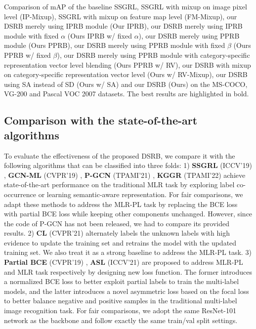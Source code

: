 \documentclass[lettersize,journal]{IEEEtran}
\begin{document}
\begin{table*}
  \caption{Comparison of mAP of the baseline SSGRL, SSGRL with mixup on image pixel level (IP-Mixup), SSGRL with mixup on feature map level (FM-Mixup), our DSRB merely using IPRB module (Our IPRB), our DSRB merely using IPRB module with fixed $\alpha$ (Ours IPRB w/ fixed $\alpha$), our DSRB merely using PPRB module (Ours PPRB), our DSRB merely using PPRB module with fixed $\beta$ (Ours PPRB w/ fixed $\beta$), our DSRB merely using PPRB module with category-specific representation vector level blending (Ours PPRB w/ RV), our DSRB with mixup on category-specific representation vector level (Ours w/ RV-Mixup), our DSRB using SA instead of SD (Ours w/ SA) and our DSRB (Ours) on the MS-COCO, VG-200 and Pascal VOC 2007 datasets. The best results are highlighted in bold.}
  \label{tab:ablation-results}
\end{table*}

\subsection{Comparison with the state-of-the-art algorithms}
To evaluate the effectiveness of the proposed DSRB, we compare it with the following algorithms that can be classified into three folds:  1) \textbf{SSGRL} (ICCV'19) \cite{Chen2019SSGRL}, \textbf{GCN-ML} (CVPR'19) \cite{Chen2019ML-GCN}, \textbf{P-GCN} (TPAMI'21) \cite{Chen2021P-GCN}, \textbf{KGGR} (TPAMI'22) \cite{Chen2022KGGR} achieve state-of-the-art performance on the traditional MLR task by exploring label co-occurrence or learning semantic-aware representation. For fair comparisons, we adapt these methods to address the MLR-PL task by replacing the BCE loss with partial BCE loss while keeping other components unchanged. However, since the code of P-GCN has not been released, we had to compare its provided results. 2) \textbf{CL} (CVPR'21) \cite{Durand2019CVPR} alternately labels the unknown labels with high evidence to update the training set and retrains the model with the updated training set. We also treat it as a strong baseline to address the MLR-PL task. 3) \textbf{Partial BCE} (CVPR'19) \cite{Durand2019CVPR}, \textbf{ASL} (ICCV'21) \cite{Ridnik2021ASL} are proposed to address MLR-PL and MLR task respectively by designing new loss function. The former introduces a normalized BCE loss to better exploit partial labels to train the multi-label models, and the latter introduces a novel asymmetric loss based on the focal loss \cite{lin2017focal-loss} to better balance negative and positive samples in the traditional multi-label image recognition task. For fair comparisons, we adopt the same ResNet-101 network as the backbone and follow exactly the same train/val split settings. 
\end{document}
